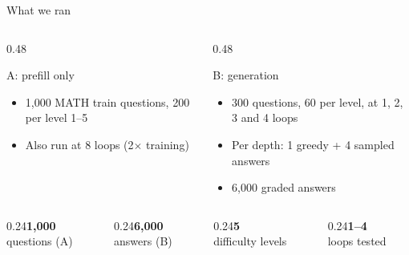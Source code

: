 \documentclass[aspectratio=169,11pt]{beamer}
\newcommand{\bignum}[3][ink]{{\color{#1}\fontsize{22}{24}\selectfont\bfseries #2}\\[2pt]{\color{muted}\small #3}}
\begin{document}
\begin{frame}{What we ran}
  \begin{columns}[T]
    \begin{column}{0.48\textwidth}
      \begin{block}{A: prefill only}
        \small
        \begin{itemize}
          \item 1,000 MATH train questions, 200 per level 1--5
          \item Also run at 8 loops (2$\times$ training)
        \end{itemize}
      \end{block}
    \end{column}
    \begin{column}{0.48\textwidth}
      \begin{block}{B: generation}
        \small
        \begin{itemize}
          \item 300 questions, 60 per level, at 1, 2, 3 and 4 loops
          \item Per depth: 1 greedy + 4 sampled answers
          \item 6,000 graded answers
        \end{itemize}
      \end{block}
    \end{column}
  \end{columns}
  \vspace{1.1em}
  \begin{columns}[T]
    \begin{column}{0.24\textwidth}\bignum{1,000}{questions (A)}\end{column}
    \begin{column}{0.24\textwidth}\bignum{6,000}{answers (B)}\end{column}
    \begin{column}{0.24\textwidth}\bignum{5}{difficulty levels}\end{column}
    \begin{column}{0.24\textwidth}\bignum{1--4}{loops tested}\end{column}
  \end{columns}
\end{frame}
\end{document}
